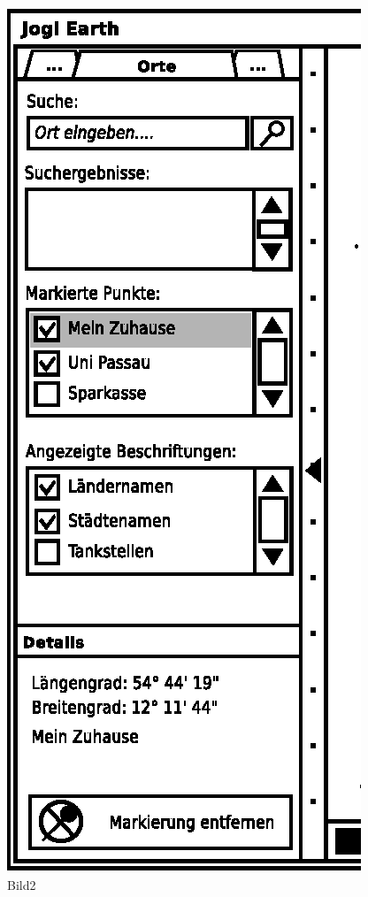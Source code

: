 \begin{figure}
	\centering
\begin{minipage}[c]{5cm}
	\centering
\includegraphics[scale=0.9]{GUI-Orte.eps}
\end{minipage}
	\caption{Bild2}
	\label{Bild2}
\begin{minipage}[c]{5cm}

\end{minipage}
\end{figure}

